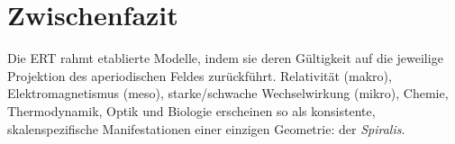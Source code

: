\section{Zwischenfazit}
\label{sec:zwischenfazit7}
Die ERT rahmt etablierte Modelle, indem sie deren Gültigkeit auf die jeweilige Projektion des aperiodischen Feldes zurückführt. 
Relativität (makro), Elektromagnetismus (meso), starke/schwache Wechselwirkung (mikro), Chemie, Thermodynamik, Optik und Biologie erscheinen so als konsistente, 
skalenspezifische Manifestationen einer einzigen Geometrie: der \emph{Spiralis}.
